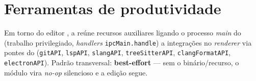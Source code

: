 \section{Ferramentas de produtividade}
\label{sec:S10-produtividade}

Em torno do editor , a  reúne recursos auxiliares ligando o processo \textit{main} do  (trabalho privilegiado, \textit{handlers} \lstinline|ipcMain.handle|) a integrações no \textit{renderer} via pontes do  (\lstinline|gitAPI|, \lstinline|lspAPI|, \lstinline|slangAPI|, \lstinline|treeSitterAPI|, \lstinline|clangFormatAPI|, \lstinline|electronAPI|). Padrão transversal: \textbf{best-effort} --- sem o binário/recurso, o módulo vira \textit{no-op} silencioso e a edição segue.

